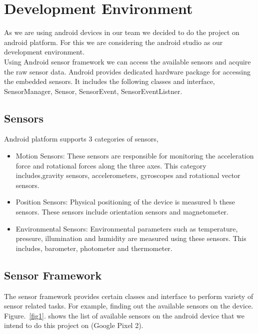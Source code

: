 \documentclass[conference]{IEEEtran}
\begin{document}
\section{Development Environment}
As we are using android devices in our team we decided to do the project on android platform. For this we are considering the android studio as our development environment.\\
Using Android sensor framework we can access the available sensors and acquire the raw sensor data. Android provides dedicated hardware package for accessing the embedded sensors. It includes the following classes and interface, SensorManager, Sensor, SensorEvent, SensorEventListner.

\subsection{Sensors}

Android platform supports 3 categories of sensors,
\begin{itemize}
    \item Motion Sensors: These sensors are responsible for monitoring the acceleration force and rotational forces along the three axes. This category includes,gravity sensors, accelerometers, gyroscopes and rotational vector sensors.
    \item Position Sensors: Physical positioning of the device is measured b these sensors. These sensors include orientation sensors and magnetometer. 
    \item Environmental Sensors: Environmental parameters such as temperature, pressure, illumination and humidity are measured using these sensors. This includes, barometer, photometer and thermometer.
\end{itemize}

\subsection{Sensor Framework}

The sensor framework provides certain classes and interface to perform variety of sensor related tasks. For example, finding out the available sensors on the device. Figure.~\ref{fig1}. shows the list of available sensors on the android device that we intend to do this project on (Google Pixel 2). \\
\end{document}
